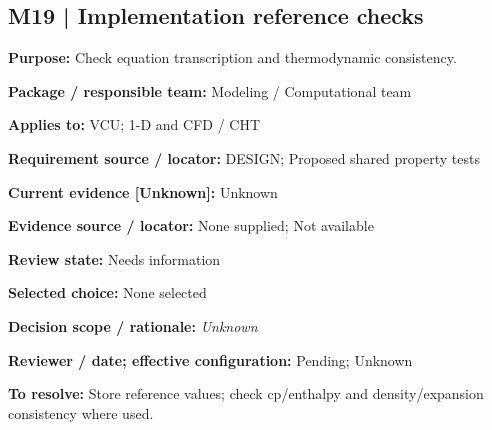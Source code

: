 \documentclass[11pt]{article}
\begin{document}
\par\noindent\begin{minipage}{\textwidth}\small\setlength{\parskip}{2pt}
\subsection*{M19 | Implementation reference checks}
\textbf{Purpose:} Check equation transcription and thermodynamic consistency.\par
\textbf{Package / responsible team:} Modeling / Computational team\par
\textbf{Applies to:} VCU; 1-D and CFD / CHT\par
\textbf{Requirement source / locator:} DESIGN; Proposed shared property tests\par
\textbf{Current evidence [Unknown]:} Unknown\par
\textbf{Evidence source / locator:} None supplied; Not available\par
\textbf{Review state:} Needs information\par
\textbf{Selected choice:} None selected\par
\textbf{Decision scope / rationale:} \textit{Unknown}\par
\textbf{Reviewer / date; effective configuration:} Pending; Unknown\par
\textbf{To resolve:} Store reference values; check cp/enthalpy and density/expansion consistency where used.\par
\end{minipage}\par\vspace{5pt}
\end{document}
